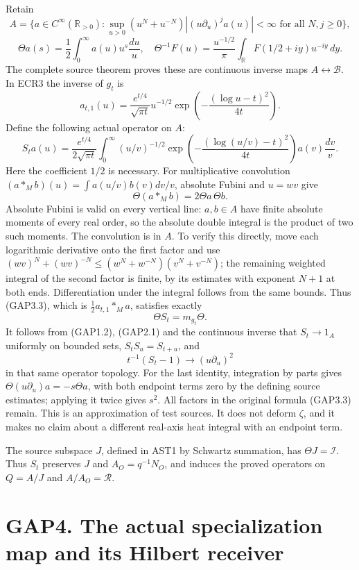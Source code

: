 Retain \[
A=\{a\in C^\infty(\mathbb R_{>0}):
\sup_{u>0}(u^N+u^{-N})|(u\partial_u)^ja(u)|<\infty
\text{ for all }N,j\ge0\},
\] \[
\Theta a(s)=\frac12\int_0^\infty a(u)u^s\frac{du}{u},\quad
\Theta^{-1}F(u)=\frac{u^{-1/2}}\pi
\int_{\mathbb R}F(1/2+iy)u^{-iy}\,dy.
\tag{GAP3.1}
\] The complete source theorem proves these are continuous inverse maps
\(A\leftrightarrow\mathcal B\). In ECR3 the inverse of \(g_t\) is \[
a_{t,1}(u)=\frac{e^{t/4}}{\sqrt{\pi t}}u^{-1/2}
\exp\!\left(-\frac{(\log u-t)^2}{4t}\right).
\tag{GAP3.2}
\] Define the following actual operator on \(A\): \[
\boxed{
S_ta(u)=\frac{e^{t/4}}{2\sqrt{\pi t}}
\int_0^\infty (u/v)^{-1/2}
\exp\!\left(-\frac{(\log(u/v)-t)^2}{4t}\right)
a(v)\frac{dv}{v}.}
\tag{GAP3.3}
\] Here the coefficient \(1/2\) is necessary. For multiplicative
convolution \((a*_Mb)(u)=\int a(u/v)b(v)dv/v\), absolute Fubini and
\(u=wv\) give \[
\Theta(a*_Mb)=2\Theta a\,\Theta b.
\tag{GAP3.4}
\] Absolute Fubini is valid on every vertical line: \(a,b\in A\) have
finite absolute moments of every real order, so the absolute double
integral is the product of two such moments. The convolution is in
\(A\). To verify this directly, move each logarithmic derivative onto
the first factor and use
\((wv)^N+(wv)^{-N}\le(w^N+w^{-N})(v^N+v^{-N})\); the remaining weighted
integral of the second factor is finite, by its estimates with exponent
\(N+1\) at both ends. Differentiation under the integral follows from
the same bounds. Thus (GAP3.3), which is \(\tfrac12a_{t,1}*_Ma\),
satisfies exactly \[
\Theta S_t=m_{g_t}\Theta.
\tag{GAP3.5}
\] It follows from (GAP1.2), (GAP2.1) and the continuous inverse that
\(S_t\to1_A\) uniformly on bounded sets, \(S_tS_u=S_{t+u}\), and \[
t^{-1}(S_t-1)\longrightarrow (u\partial_u)^2
\tag{GAP3.6}
\] in that same operator topology. For the last identity, integration by
parts gives \(\Theta(u\partial_u)a=-s\Theta a\), with both endpoint
terms zero by the defining source estimates; applying it twice gives
\(s^2\). All factors in the original formula (GAP3.3) remain. This is an
approximation of test sources. It does not deform \(\zeta\), and it
makes no claim about a different real-axis heat integral with an
endpoint term.

The source subspace \(J\), defined in AST1 by Schwartz summation, has
\(\Theta J=\mathcal I\). Thus \(S_t\) preserves \(J\) and
\(A_O=q^{-1}N_O\), and induces the proved operators on \(Q=A/J\) and
\(A/A_O=\mathcal R\).

\section{GAP4. The actual specialization map and its Hilbert
receiver}\label{gap4.-the-actual-specialization-map-and-its-hilbert-receiver}

